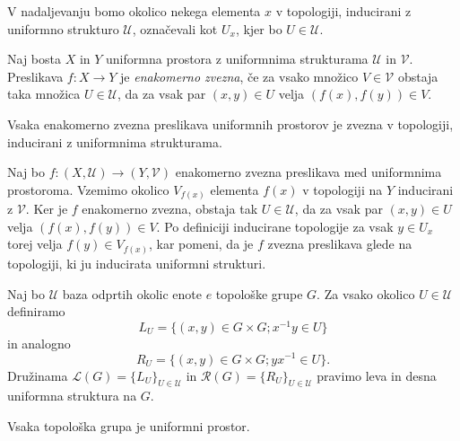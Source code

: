 \documentclass[mat1]{fmfdelo}
\newcommand{\Ucurl}{\mathcal{U}}
\begin{document}
\begin{opomba}
	V nadaljevanju bomo okolico nekega elementa $x$ v topologiji, inducirani z uniformno strukturo $\mathcal{U}$, označevali kot $U_x$, kjer bo $U \in \mathcal{U}$.
\end{opomba}

\begin{definicija}\label{def:enakzveznost}
	Naj bosta $X$ in $Y$ uniformna prostora z uniformnima strukturama $\mathcal{U}$ in $\mathcal{V}$. Preslikava $f: X \to Y$ je \emph{enakomerno zvezna}, če za vsako množico $V \in \mathcal{V}$ obstaja taka množica $U \in \mathcal{U}$, da za vsak par $(x, y) \in U$ velja $(f(x), f(y)) \in V$.
\end{definicija}

\begin{trditev}\label{trd:enakzveznazvezna}
	Vsaka enakomerno zvezna preslikava uniformnih prostorov je zvezna v topologiji, inducirani z uniformnima strukturama.
\end{trditev}

\begin{dokaz}
	Naj bo $f\colon (X, \mathcal{U}) \to (Y, \mathcal{V})$ enakomerno zvezna preslikava med uniformnima prostoroma. Vzemimo okolico $V_{f(x)}$ elementa $f(x)$ v topologiji na $Y$ inducirani z $\mathcal{V}$. Ker je $f$ enakomerno zvezna, obstaja tak $U \in \mathcal{U}$, da za vsak par $(x, y) \in U$ velja $(f(x), f(y)) \in V$. Po definiciji inducirane topologije za vsak $y \in U_x$ torej velja $f(y) \in V_{f(x)}$, kar pomeni, da je $f$ zvezna preslikava glede na topologiji, ki ju inducirata uniformni strukturi.
\end{dokaz}

\begin{definicija}\label{def:levadesnauni}
	Naj bo $\Ucurl$ baza odprtih okolic enote $e$ topološke grupe $G$. Za vsako okolico $U \in \Ucurl$ definiramo \[L_U = \lbrace (x, y) \in G \times G ; x^{-1}y \in U \rbrace\] in analogno \[R_U = \lbrace (x, y) \in G \times G ; yx^{-1} \in U \rbrace.\] Družinama $\mathcal{L}(G) = \lbrace L_U \rbrace_{U \in \Ucurl}$ in $\mathcal{R}(G) = \lbrace R_U \rbrace_{U \in \Ucurl}$ pravimo leva in desna uniformna struktura na $G$.
\end{definicija}

\begin{trditev}\label{trd:topguniform}
	Vsaka topološka grupa je uniformni prostor.
\end{trditev}
\end{document}
